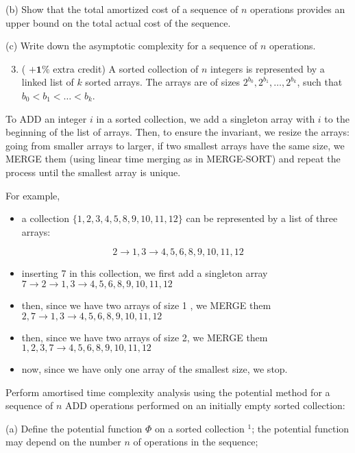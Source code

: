 \documentclass[10pt]{article}
\begin{document}
(b) Show that the total amortized cost of a sequence of $n$ operations provides an upper bound on the total actual cost of the sequence.

(c) Write down the asymptotic complexity for a sequence of $n$ operations.

\begin{enumerate}
  \setcounter{enumi}{2}
  \item ( $+\mathbf{1 \%}$ extra credit) A sorted collection of $n$ integers is represented by a linked list of $k$ sorted arrays. The arrays are of sizes $2^{b_{0}}, 2^{b_{1}}, \ldots, 2^{b_{k}}$, such that $b_{0}<b_{1}<\ldots<b_{k}$.
\end{enumerate}

To ADD an integer $i$ in a sorted collection, we add a singleton array with $i$ to the beginning of the list of arrays. Then, to ensure the invariant, we resize the arrays: going from smaller arrays to larger, if two smallest arrays have the same size, we MERGE them (using linear time merging as in MERGE-SORT) and repeat the process until the smallest array is unique.

For example,

\begin{itemize}
  \item a collection $\{1,2,3,4,5,8,9,10,11,12\}$ can be represented by a list of three arrays:
\end{itemize}

$$
2 \rightarrow 1,3 \rightarrow 4,5,6,8,9,10,11,12
$$

\begin{itemize}
  \item inserting 7 in this collection, we first add a singleton array $7 \rightarrow 2 \rightarrow 1,3 \rightarrow 4,5,6,8,9,10,11,12$
  \item then, since we have two arrays of size 1 , we MERGE them $2,7 \rightarrow 1,3 \rightarrow 4,5,6,8,9,10,11,12$
  \item then, since we have two arrays of size 2, we MERGE them $1,2,3,7 \rightarrow 4,5,6,8,9,10,11,12$
  \item now, since we have only one array of the smallest size, we stop.
\end{itemize}

Perform amortised time complexity analysis using the potential method for a sequence of $n$ ADD operations performed on an initially empty sorted collection:

(a) Define the potential function $\Phi$ on a sorted collection ${ }^{1}$; the potential function may depend on the number $n$ of operations in the sequence;
\end{document}

